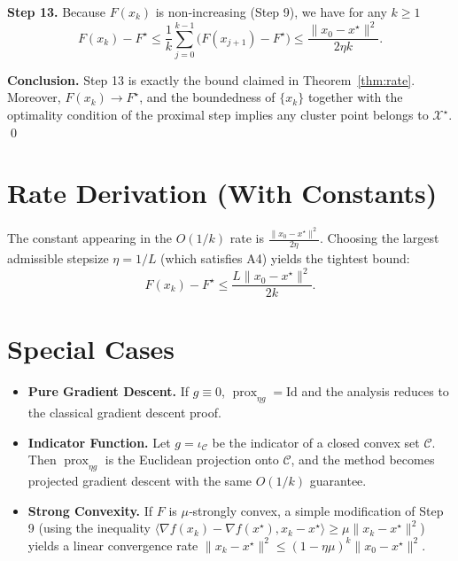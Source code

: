 \documentclass{article}
\newcommand{\prox}{\operatorname{prox}}
\begin{document}
\noindent\textbf{Step 13.} Because $F(x_{k})$ is non‑increasing (Step 9), we have for any $k\ge1$
\[
F(x_{k})-F^{\star}\le
\frac{1}{k}\sum_{j=0}^{k-1}\bigl(F(x_{j+1})-F^{\star}\bigr)
\le\frac{\|x_{0}-x^{\star}\|^{2}}{2\eta k}.
\tag{Step 13}
\]

\noindent\textbf{Conclusion.} Step 13 is exactly the bound claimed in Theorem~\ref{thm:rate}.  Moreover,
$F(x_{k})\to F^{\star}$, and the boundedness of $\{x_{k}\}$ together with the optimality condition of the proximal step implies any cluster point belongs to $\mathcal{X}^{\star}$. \qed

\section*{Rate Derivation (With Constants)}
The constant appearing in the $O(1/k)$ rate is $\frac{\|x_{0}-x^{\star}\|^{2}}{2\eta}$.  Choosing the largest admissible stepsize $\eta=1/L$ (which satisfies A4) yields the tightest bound:
\[
F(x_{k})-F^{\star}\le \frac{L\|x_{0}-x^{\star}\|^{2}}{2k}.
\]

\section*{Special Cases}
\begin{itemize}[noitemsep]
\item \textbf{Pure Gradient Descent.} If $g\equiv0$, $\prox_{\eta g}=\mathrm{Id}$ and the analysis reduces to the classical gradient descent proof.
\item \textbf{Indicator Function.} Let $g=\iota_{\mathcal{C}}$ be the indicator of a closed convex set $\mathcal{C}$. Then $\prox_{\eta g}$ is the Euclidean projection onto $\mathcal{C}$, and the method becomes projected gradient descent with the same $O(1/k)$ guarantee.
\item \textbf{Strong Convexity.} If $F$ is $\mu$‑strongly convex, a simple modification of Step 9 (using the inequality $\langle \nabla f(x_{k})- \nabla f(x^{\star}), x_{k}-x^{\star}\rangle\ge\mu\|x_{k}-x^{\star}\|^{2}$) yields a linear convergence rate $ \|x_{k}-x^{\star}\|^{2}\le(1-\eta\mu)^{k}\|x_{0}-x^{\star}\|^{2}$.
\end{itemize}

\end{document}
